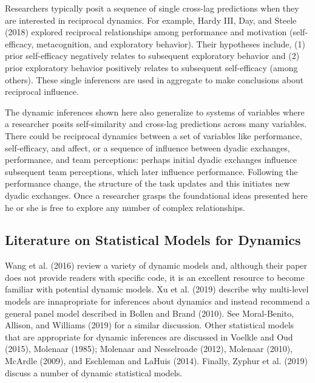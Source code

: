 \documentclass[english,,man]{apa6}
\begin{document}
Researchers typically posit a sequence of single cross-lag predictions when they are interested in reciprocal dynamics. For example, Hardy III, Day, and Steele (2018) explored reciprocal relationships among performance and motivation (self-efficacy, metacognition, and exploratory behavior). Their hypotheses include, (1) prior self-efficacy negatively relates to subsequent exploratory behavior and (2) prior exploratory behavior positively relates to subsequent self-efficacy (among others). These single inferences are used in aggregate to make conclusions about reciprocal influence.

The dynamic inferences shown here also generalize to systems of variables where a researcher posits self-similarity and cross-lag predictions across many variables. There could be reciprocal dynamics between a set of variables like performance, self-efficacy, and affect, or a sequence of influence between dyadic exchanges, performance, and team perceptions: perhaps initial dyadic exchanges influence subsequent team perceptions, which later influence performance. Following the performance change, the structure of the task updates and this initiates new dyadic exchanges. Once a researcher grasps the foundational ideas presented here he or she is free to explore any number of complex relationships.

\hypertarget{literature-on-statistical-models-for-dynamics}{%
\subsection{Literature on Statistical Models for Dynamics}\label{literature-on-statistical-models-for-dynamics}}

Wang et al. (2016) review a variety of dynamic models and, although their paper does not provide readers with specific code, it is an excellent resource to become familiar with potential dynamic models. Xu et al. (2019) describe why multi-level models are innapropriate for inferences about dynamics and instead recommend a general panel model described in Bollen and Brand (2010). See Moral-Benito, Allison, and Williams (2019) for a similar discussion. Other statistical models that are appropriate for dynamic inferences are discussed in Voelkle and Oud (2015), Molenaar (1985); Molenaar and Nesselroade (2012), Molenaar (2010), McArdle (2009), and Eschleman and LaHuis (2014). Finally, Zyphur et al. (2019) discuss a number of dynamic statistical models.
\end{document}
